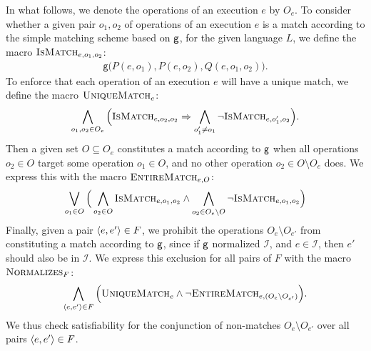 In what follows, we denote the operations of an execution $e$ by $O_e$.
To consider whether a given pair $o_1, o_2$ of operations of an execution $e$
is a match according to the simple matching scheme based on ${\sf g}$, for
the given language $L$, we define the macro $\textsc{IsMatch}_{e,o_1,o_2}$:
\begin{align*}
  \mathsf{g}\big( P(e,o_1), P(e,o_2), Q(e,o_1,o_2) \big).
\end{align*}
To enforce that each operation of an execution $e$ will have a unique match,
we define the macro $\textsc{UniqueMatch}_e$:
\begin{align*}
  \bigwedge_{o_1,o_2 \in O_e} \Big(
    \textsc{IsMatch}_{e,o_2,o_2} \implies
    \bigwedge_{o_1' \neq o_1} \lnot \textsc{IsMatch}_{e,o_1',o_2}
  \Big).
\end{align*}
Then a given set $O \subseteq O_e$ constitutes a match according to
${\sf g}$ when all operations $o_2 \in O$ target some operation $o_1 \in O$,
and no other operation $o_2 \in O \setminus O_e$ does. We express this with the
macro $\textsc{EntireMatch}_{e,O}$:
\begin{align*}
  \bigvee_{o_1 \in O}
  \Big(
  \bigwedge_{o_2 \in O} \textsc{IsMatch}_{e,o_1,o_2}
  \land \bigwedge_{o_2 \in O_e \setminus O} \lnot \textsc{IsMatch}_{e,o_1,o_2}
  \Big)
\end{align*}
Finally, given a pair $\tup{e,e'} \in F$, we prohibit the operations $O_e
\setminus O_{e'}$ from constituting a match according to ${\sf g}$, since if
${\sf g}$ normalized $\mathcal{I}$, and $e \in \mathcal{I}$, then $e'$ should
also be in $\mathcal{I}$. We express this exclusion for all pairs of $F$
with the macro $\textsc{Normalizes}_{F}$:
\begin{align*}
  \bigwedge_{\tup{e,e'}\in F} \Big(
    \textsc{UniqueMatch}_{e}
    \land \lnot \textsc{EntireMatch}_{e,(O_e \setminus O_{e'})}
  \Big).
\end{align*}
We thus check satisfiability for the conjunction of non-matches $O_e \setminus
O_{e'}$ over all pairs $\tup{e,e'} \in F$.

